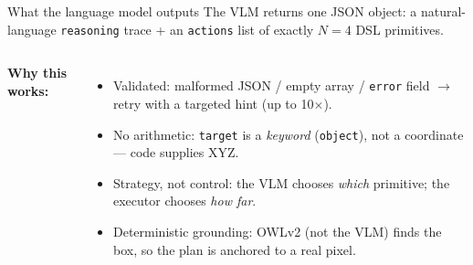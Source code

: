\documentclass[aspectratio=169,10pt]{beamer}
\begin{document}
\begin{frame}{What the language model outputs}
The VLM returns \alert{one JSON object}: a natural-language \texttt{reasoning} trace + an \texttt{actions} list of exactly $N{=}4$ DSL primitives.
\vspace{3pt}

\begin{columns}[T,onlytextwidth]

\footnotesize
\textbf{Why this works:}
\begin{itemize}
    \item \alert{Validated}: malformed JSON / empty array / \texttt{error} field $\to$ retry with a targeted hint (up to 10$\times$).
    \item \alert{No arithmetic}: \texttt{target} is a \emph{keyword} (\texttt{object}), not a coordinate --- code supplies XYZ.
    \item \alert{Strategy, not control}: the VLM chooses \emph{which} primitive; the executor chooses \emph{how far}.
    \item \alert{Deterministic grounding}: OWLv2 (not the VLM) finds the box, so the plan is anchored to a real pixel.
\end{itemize}
\end{columns}
\end{frame}
\end{document}
